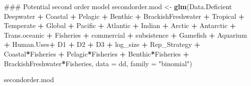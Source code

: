 \documentclass[]{article}
\newenvironment{Shaded}{\begin{snugshade}}{\end{snugshade}}
\newcommand{\KeywordTok}[1]{\textcolor[rgb]{0.13,0.29,0.53}{\textbf{#1}}}
\newcommand{\DataTypeTok}[1]{\textcolor[rgb]{0.13,0.29,0.53}{#1}}
\newcommand{\StringTok}[1]{\textcolor[rgb]{0.31,0.60,0.02}{#1}}
\newcommand{\OperatorTok}[1]{\textcolor[rgb]{0.81,0.36,0.00}{\textbf{#1}}}
\newcommand{\NormalTok}[1]{#1}
\begin{document}
\begin{Shaded}
\begin{Highlighting}[]
\NormalTok{### Potential second order model}
\NormalTok{secondorder.mod <-}\StringTok{ }\KeywordTok{glm}\NormalTok{(Data.Deficient }\OperatorTok{~}\StringTok{ }\NormalTok{Deepwater }\OperatorTok{+}\StringTok{ }\NormalTok{Coastal }\OperatorTok{+}\StringTok{ }\NormalTok{Pelagic }\OperatorTok{+}\StringTok{ }\NormalTok{Benthic }\OperatorTok{+}\StringTok{ }\NormalTok{BrackishFreshwater }\OperatorTok{+}
\StringTok{      }\NormalTok{Tropical }\OperatorTok{+}\StringTok{ }\NormalTok{Temperate }\OperatorTok{+}\StringTok{ }
\StringTok{      }\NormalTok{Global }\OperatorTok{+}\StringTok{ }\NormalTok{Pacific }\OperatorTok{+}\StringTok{ }\NormalTok{Atlantic }\OperatorTok{+}\StringTok{ }\NormalTok{Indian }\OperatorTok{+}\StringTok{ }\NormalTok{Arctic }\OperatorTok{+}\StringTok{ }\NormalTok{Antarctic }\OperatorTok{+}\StringTok{ }\NormalTok{Trans.oceanic }\OperatorTok{+}
\StringTok{      }\NormalTok{Fisheries }\OperatorTok{+}\StringTok{ }\NormalTok{commercial }\OperatorTok{+}\StringTok{ }\NormalTok{subsistence }\OperatorTok{+}\StringTok{ }\NormalTok{Gamefish }\OperatorTok{+}\StringTok{ }\NormalTok{Aquarium }\OperatorTok{+}\StringTok{ }\NormalTok{Human.Uses}\OperatorTok{+}\StringTok{ }\NormalTok{D1 }\OperatorTok{+}\StringTok{ }\NormalTok{D2 }\OperatorTok{+}\StringTok{ }\NormalTok{D3 }\OperatorTok{+}
\StringTok{      }\NormalTok{log_size }\OperatorTok{+}\StringTok{ }\NormalTok{Rep_Strategy }\OperatorTok{+}\StringTok{ }\NormalTok{Coastal}\OperatorTok{*}\NormalTok{Fisheries }\OperatorTok{+}\StringTok{ }\NormalTok{Pelagic}\OperatorTok{*}\NormalTok{Fisheries }\OperatorTok{+}\StringTok{ }\NormalTok{Benthic}\OperatorTok{*}\NormalTok{Fisheries }\OperatorTok{+}\StringTok{ }\NormalTok{BrackishFreshwater}\OperatorTok{*}\NormalTok{Fisheries, }\DataTypeTok{data =}\NormalTok{ dd, }\DataTypeTok{family =} \StringTok{"binomial"}\NormalTok{)}

\NormalTok{secondorder.mod }
\end{Highlighting}
\end{Shaded}
\end{document}
